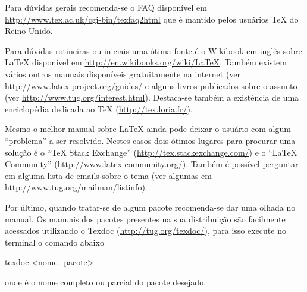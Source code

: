 Para dúvidas gerais recomenda-se o FAQ disponível em \url{http://www.tex.ac.uk/cgi-bin/texfaq2html} que é mantido pelos usuários TeX do Reino Unido.

Para dúvidas rotineiras ou iniciais uma ótima fonte é o Wikibook em inglês sobre LaTeX disponível em \url{http://en.wikibooks.org/wiki/LaTeX}. Também existem vários outros manuais disponíveis gratuitamente na internet (ver \url{http://www.latex-project.org/guides/} e alguns livros publicados sobre o assunto (ver \url{http://www.tug.org/interest.html}). Destaca-se também a existência de uma enciclopédia dedicada ao TeX (\url{http://tex.loria.fr/}).

Mesmo o melhor manual sobre LaTeX ainda pode deixar o usuário com algum ``problema'' a ser resolvido. Nestes casos dois ótimos lugares para procurar uma solução é o ``TeX Stack Exchange'' (\url{http://tex.stackexchange.com/}) e o ``LaTeX Community'' (\url{http://www.latex-community.org/}). Também é possível perguntar em alguma lista de emails sobre o tema (ver algumas em \url{http://www.tug.org/mailman/listinfo}).

Por último, quando tratar-se de algum pacote recomenda-se dar uma olhada no manual. Os manuais dos pacotes presentes na sua distribuição são facilmente acessados utilizando o Texdoc (\url{http://tug.org/texdoc/}), para isso execute no terminal o comando abaixo
\begin{code}
texdoc <nome_pacote>
\end{code}
onde  é o nome completo ou parcial do pacote desejado.


